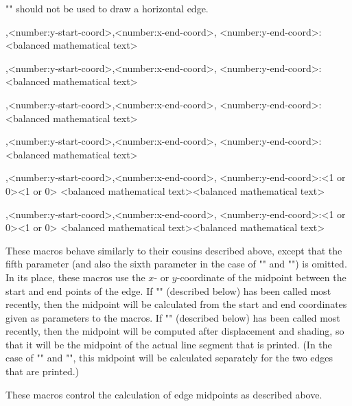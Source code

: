 \documentclass[11pt]{article}
\begin{document}
"\ctelrg" should not be used to draw a horizontal edge.
\begin{myverb}
    ,<number:y-start-coord>,<number:x-end-coord>,
        <number:y-end-coord>:{<balanced mathematical text>}

    ,<number:y-start-coord>,<number:x-end-coord>,
        <number:y-end-coord>:{<balanced mathematical text>}

    ,<number:y-start-coord>,<number:x-end-coord>,
        <number:y-end-coord>:{<balanced mathematical text>}

    ,<number:y-start-coord>,<number:x-end-coord>,
        <number:y-end-coord>:{<balanced mathematical text>}

    ,<number:y-start-coord>,<number:x-end-coord>,
        <number:y-end-coord>:{<1 or 0>}{<1 or 0>}
        {<balanced mathematical text>}{<balanced mathematical text>}

    ,<number:y-start-coord>,<number:x-end-coord>,
        <number:y-end-coord>:{<1 or 0>}{<1 or 0>}
        {<balanced mathematical text>}{<balanced mathematical text>}
\end{myverb}
These macros behave similarly to their cousins described above, except that
the fifth parameter (and also the sixth parameter in the case of "\ctetb" and
"\ctelr") is omitted.  In its place, these macros use the $x$- or $y$-coordinate
of the midpoint between the start and end points of the edge.  If "\ctoutermid"
(described below) has been called most recently, then the midpoint will
be calculated from the start and end coordinates given as parameters to the
macros.  If "\ctinnermid" (described below) has been called most recently,
then the midpoint will be computed after displacement and shading, so that
it will be the midpoint of the actual line segment that is printed.
(In the case of "\ctetb" and "\ctelr", this midpoint will be calculated
separately for the two edges that are printed.)
\begin{myverb}
    \ctoutermid

    \ctinnermid
\end{myverb}
These macros control the calculation of edge midpoints as described above.
\end{document}
